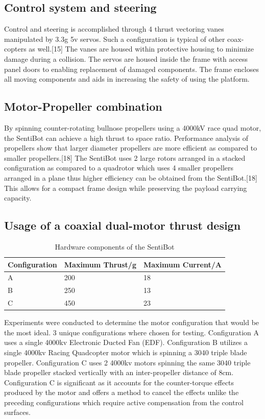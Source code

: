 \documentclass[12pt]{article}
\begin{document}
\subsection{Control system and steering}

Control and steering is accomplished through 4 thrust vectoring vanes manipulated by 3.3g 5v servos. Such a configuration is typical of other coax-copters as well.[15] The vanes are housed within protective housing to minimize damage during a collision. The servos are housed inside the frame with access panel doors to enabling replacement of damaged components. The frame encloses all moving components and aids in increasing the safety of using the platform.

\subsection{Motor-Propeller combination}

By spinning counter-rotating bullnose propellers using a 4000kV race quad motor, the SentiBot can achieve a high thrust to space ratio. Performance analysis of propellers show that larger diameter propellers are more efficient as compared to smaller propellers.[18] The SentiBot uses 2 large rotors arranged in a stacked configuration as compared to a quadrotor which uses 4 smaller propellers arranged in a plane thus higher efficiency can be obtained from the SentiBot.[18] This allows for a compact frame design while preserving the payload carrying capacity.

\subsection{Usage of a coaxial dual-motor thrust design}

\begin{table}[b]
	\centering
	\begin{tabular}{ | l | l l | }
		Configuration & Maximum Thrust/g & Maximum Current/A \\
		\hline
		A & 200 & 18 \\
		B & 250 & 13 \\
		C & 450 & 23 \\
	\end{tabular}
	\caption{Hardware components of the SentiBot}
	\label{fig:sb-configs}
\end{table}

Experiments were conducted to determine the motor configuration that would be the most ideal. 3 unique configurations where chosen for testing. Configuration A uses a single 4000kv Electronic Ducted Fan (EDF).  Configuration B utilizes a single 4000kv Racing Quadcopter motor which is spinning a 3040 triple blade propeller. Configuration C uses 2 4000kv motors spinning the same 3040 triple blade propeller stacked vertically with an inter-propeller distance of 8cm. Configuration C is significant as it accounts for the counter-torque effects produced by the motor and offers a method to cancel the effects unlike the preceding configurations which require active compensation from the control surfaces.
\end{document}
